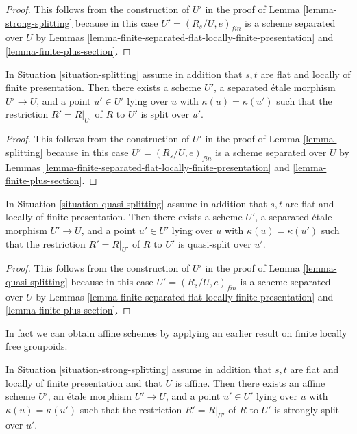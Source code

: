 \begin{proof}
This follows from the construction of $U'$ in the proof of
Lemma \ref{lemma-strong-splitting}
because in this case $U' = (R_s/U, e)_{fin}$ is a scheme separated over
$U$ by
Lemmas \ref{lemma-finite-separated-flat-locally-finite-presentation} and
\ref{lemma-finite-plus-section}.
\end{proof}

\begin{lemma}
\label{lemma-splitting-scheme}
In Situation \ref{situation-splitting} assume in addition that
$s, t$ are flat and locally of finite presentation.
Then there exists a scheme $U'$, a separated \'etale morphism
$U' \to U$, and a point $u' \in U'$
lying over $u$ with $\kappa(u) = \kappa(u')$
such that the restriction $R' = R|_{U'}$ of $R$ to $U'$
is split over $u'$.
\end{lemma}

\begin{proof}
This follows from the construction of $U'$ in the proof of
Lemma \ref{lemma-splitting}
because in this case $U' = (R_s/U, e)_{fin}$ is a scheme separated over
$U$ by
Lemmas \ref{lemma-finite-separated-flat-locally-finite-presentation} and
\ref{lemma-finite-plus-section}.
\end{proof}

\begin{lemma}
\label{lemma-quasi-splitting-scheme}
In Situation \ref{situation-quasi-splitting} assume in addition that
$s, t$ are flat and locally of finite presentation.
Then there exists a scheme $U'$, a separated \'etale morphism
$U' \to U$, and a point $u' \in U'$ lying over $u$ with
$\kappa(u) = \kappa(u')$ such that the restriction $R' = R|_{U'}$ of
$R$ to $U'$ is quasi-split over $u'$.
\end{lemma}

\begin{proof}
This follows from the construction of $U'$ in the proof of
Lemma \ref{lemma-quasi-splitting}
because in this case $U' = (R_s/U, e)_{fin}$ is a scheme separated
over $U$ by
Lemmas \ref{lemma-finite-separated-flat-locally-finite-presentation} and
\ref{lemma-finite-plus-section}.
\end{proof}

\noindent
In fact we can obtain affine schemes by applying an earlier result
on finite locally free groupoids.

\begin{lemma}
\label{lemma-strong-splitting-affine-scheme}
In Situation \ref{situation-strong-splitting} assume in addition that
$s, t$ are flat and locally of finite presentation and that $U$ is affine.
Then there exists an affine scheme $U'$, an \'etale morphism
$U' \to U$, and a point $u' \in U'$ lying over $u$ with
$\kappa(u) = \kappa(u')$ such that the restriction $R' = R|_{U'}$ of
$R$ to $U'$ is strongly split over $u'$.
\end{lemma}

